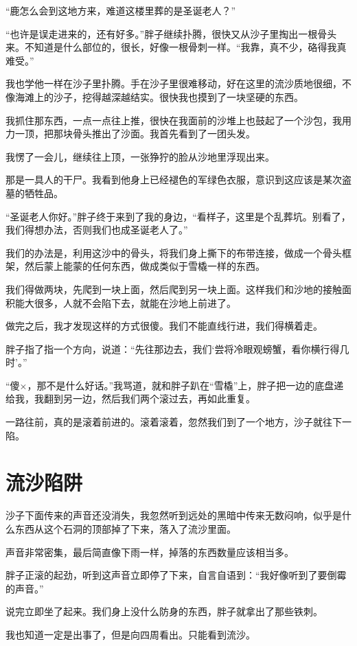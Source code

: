 “鹿怎么会到这地方来，难道这楼里葬的是圣诞老人？”

“也许是误走进来的，还有好多。”胖子继续扑腾，很快又从沙子里掏出一根骨头来。不知道是什么部位的，很长，好像一根骨刺一样。“我靠，真不少，硌得我真难受。”

我也学他一样在沙子里扑腾。手在沙子里很难移动，好在这里的流沙质地很细，不像海滩上的沙子，挖得越深越结实。很快我也摸到了一块坚硬的东西。

我抓住那东西，一点一点往上推，很快在我面前的沙堆上也鼓起了一个沙包，我用力一顶，把那块骨头推出了沙面。我首先看到了一团头发。

我愣了一会儿，继续往上顶，一张狰狞的脸从沙地里浮现出来。

那是一具人的干尸。我看到他身上已经褪色的军绿色衣服，意识到这应该是某次盗墓的牺牲品。

“圣诞老人你好。”胖子终于来到了我的身边，“看样子，这里是个乱葬坑。别看了，我们得想办法，否则我们也成圣诞老人了。”

我们的办法是，利用这沙中的骨头，将我们身上撕下的布带连接，做成一个骨头框架，然后蒙上能蒙的任何东西，做成类似于雪橇一样的东西。

我们得做两块，先爬到一块上面，然后爬到另一块上面。这样我们和沙地的接触面积能大很多，人就不会陷下去，就能在沙地上前进了。

做完之后，我才发现这样的方式很傻。我们不能直线行进，我们得横着走。

胖子指了指一个方向，说道：“先往那边去，我们‘尝将冷眼观螃蟹，看你横行得几时’。”

“傻×，那不是什么好话。”我骂道，就和胖子趴在“雪橇”上，胖子把一边的底盘递给我，我翻到另一边，然后我们两个滚过去，再如此重复。

一路往前，真的是滚着前进的。滚着滚着，忽然我们到了一个地方，沙子就往下一陷。

\chapter{流沙陷阱}

沙子下面传来的声音还没消失，我忽然听到远处的黑暗中传来无数闷响，似乎是什么东西从这个石洞的顶部掉了下来，落入了流沙里面。

声音非常密集，最后简直像下雨一样，掉落的东西数量应该相当多。

胖子正滚的起劲，听到这声音立即停了下来，自言自语到：“我好像听到了要倒霉的声音。”

说完立即坐了起来。我们身上没什么防身的东西，胖子就拿出了那些铁刺。

我也知道一定是出事了，但是向四周看出。只能看到流沙。

